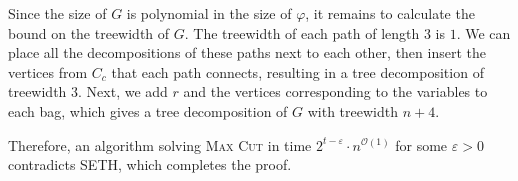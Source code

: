 \documentclass[12pt]{article}
\begin{document}
	Since the size of \(G\) is polynomial in the size of \(\varphi\), it remains
	to calculate the bound on the treewidth of \(G\). The treewidth of each path
	of length \(3\) is \(1\). We can place all the decompositions of these paths
	next to each other, then insert the vertices from \(C_{c}\) that each path
	connects, resulting in a tree decomposition of treewidth 3. Next, we add
	\(r\) and the vertices corresponding to the variables to each bag, which
	gives a tree decomposition of \(G\) with treewidth \(n + 4\).
	
	\medskip
	
	Therefore, an algorithm solving \textsc{Max Cut} in time
	\(2^{t - \varepsilon} \cdot n^{\mathcal{O}(1)}\) for some \(\varepsilon >
	0\) contradicts SETH, which completes the proof.
\end{document}
